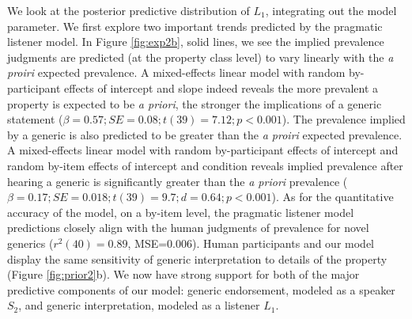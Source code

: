 \documentclass[12pt,letterpaper]{article}
\newcommand{\mht}[1]{\textcolor{Blue}{[mht: #1]}}
\begin{document}
We look at the posterior predictive distribution of $L_1$, integrating out the model parameter.
We first explore two important trends predicted by the pragmatic listener model.
In Figure \ref{fig:exp2b}, solid lines, we see the implied prevalence judgments are predicted (at the property class level) to vary linearly with the \emph{a proiri} expected prevalence. 
A mixed-effects linear model with random by-participant effects of intercept and slope indeed reveals the more prevalent a property is expected to be \emph{a priori}, the stronger the implications of a generic statement ($\beta = 0.57; SE = 0.08; t(39) = 7.12; p < 0.001$).
The prevalence implied by a generic is also predicted to be greater than the \emph{a proiri} expected prevalence.
A mixed-effects linear model with random by-participant effects of intercept and random by-item effects of intercept and condition reveals implied prevalence after hearing a generic is significantly greater than the \emph{a priori} prevalence ($\beta = 0.17; SE = 0.018; t(39) = 9.7; d = 0.64; p < 0.001$).
As for the quantitative accuracy of the model, on a by-item level, the pragmatic listener model predictions closely align with the human judgments of prevalence for novel generics ($r^2(40)=0.89$, MSE=0.006).
Human participants and our model display the same sensitivity of generic interpretation to details of the property (Figure \ref{fig:prior2}b). 
We now have strong support for both of the major predictive components of our model: generic endorsement, modeled as a speaker $S_2$, and generic interpretation, modeled as a listener $L_1$.

\end{document}
